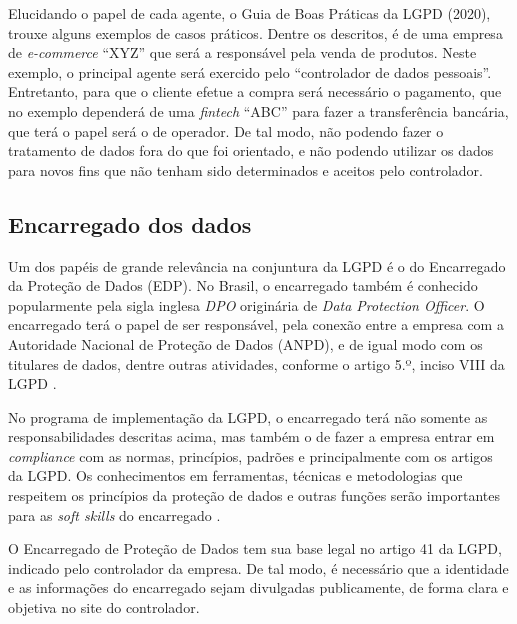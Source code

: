 \documentclass[
	12pt,				%
	openright,			%
	oneside,			%
	a4paper,			%
	english,			%
	french,				%
	spanish,			%
	brazil,				%
	]{abntex2}
\begin{document}
Elucidando o papel de cada agente, o Guia de Boas Práticas da LGPD (2020), trouxe alguns exemplos de casos práticos. Dentre os descritos, é de uma empresa de \textit{e-commerce} “XYZ” que será a responsável pela venda de produtos. Neste exemplo, o principal agente será exercido pelo “controlador de dados pessoais”. Entretanto, para que o cliente efetue a compra será necessário o pagamento, que no exemplo dependerá de uma \textit{fintech} “ABC” para fazer a transferência bancária, que terá o papel será o de operador. De tal modo, não podendo fazer o tratamento de dados fora do que foi orientado, e não podendo utilizar os dados para novos fins que não tenham sido determinados e aceitos pelo controlador.



\subsection{Encarregado dos dados}
Um dos papéis de grande relevância na conjuntura da LGPD é o do Encarregado da Proteção de Dados (EDP). No Brasil, o encarregado também é conhecido popularmente pela sigla inglesa \textit{DPO} originária de \textit{Data Protection Officer}. O encarregado terá o papel de ser responsável, pela conexão entre a empresa com a Autoridade Nacional de Proteção de Dados (ANPD), e de igual modo com os titulares de dados, dentre outras atividades, conforme o artigo 5.º, inciso VIII da LGPD \cite{Basan2021}. 

No programa de implementação da LGPD, o encarregado terá não somente as responsabilidades descritas acima, mas também o de fazer a empresa entrar em \textit{compliance} com as normas, princípios, padrões e principalmente com os artigos da LGPD. Os conhecimentos em ferramentas, técnicas e metodologias que respeitem os princípios da proteção de dados e outras funções serão importantes para as \textit{soft skills} do encarregado \cite{Vainzof2020}.

O Encarregado de Proteção de Dados tem sua base legal no artigo 41 da LGPD, indicado pelo controlador da empresa. De tal modo, é necessário que a identidade e as informações do encarregado sejam divulgadas publicamente, de forma clara e objetiva no site do controlador\cite{Bioni2020}. 
\end{document}
